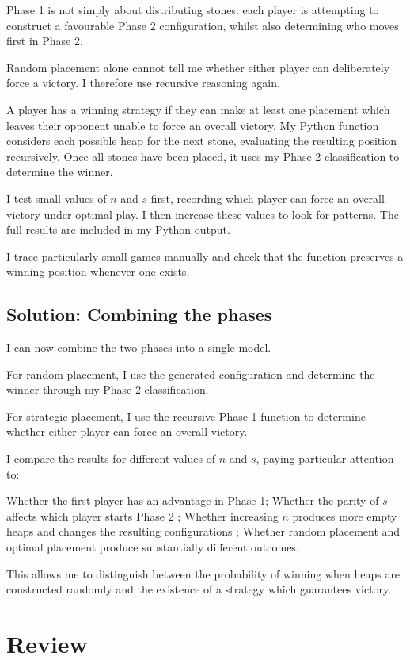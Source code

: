 \documentclass[11pt]{article}
\newcommand{\keywordfont}{\textsc}
\newcommand{\keyword}[1]{%
  \marginpar{\raggedright\small\keywordfont{#1}}}
\begin{document}
\keyword{Aha}
Phase 1 is not simply about distributing stones: each player is attempting to construct a favourable Phase 2 configuration, whilst also determining who moves first in Phase 2.

Random placement alone cannot tell me whether either player can deliberately force a victory. I therefore use recursive reasoning again.

A player has a winning strategy if they can make at least one placement which leaves their opponent unable to force an overall victory. My Python function considers each possible heap for the next stone, evaluating the resulting position recursively. Once all stones have been placed, it uses my Phase 2 classification to determine the winner.

\keyword{Try}
I test small values of $n$ and $s$ first, recording which player can force an overall victory under optimal play. I then increase these values to look for patterns. The full results are included in my Python output.

\keyword{Check}
I trace particularly small games manually and check that the function preserves a winning position whenever one exists.

\subsection{Solution: Combining the phases}

I can now combine the two phases into a single model.

For random placement, I use the generated configuration and determine the winner through my Phase 2 classification.

For strategic placement, I use the recursive Phase 1 function to determine whether either player can force an overall victory.

I compare the results for different values of $n$ and $s$, paying particular attention to:

Whether the first player has an advantage in Phase 1; Whether the parity of $s$ affects which player starts Phase 2 ; Whether increasing $n$ produces more empty heaps and changes the resulting configurations ; Whether random placement and optimal placement produce substantially different outcomes.


This allows me to distinguish between the probability of winning when heaps are constructed randomly and the existence of a strategy which guarantees victory.

\section{Review}
\end{document}
